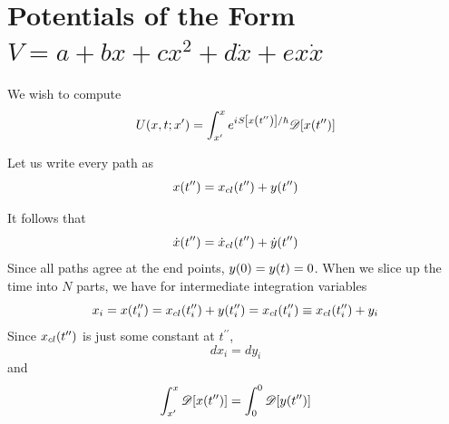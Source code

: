 	\section{Potentials of the Form \texorpdfstring{$V=a+b x+ c x^2 + d \dot{x} + e x \dot{x}$}{PDFstring}}
	We wish to compute
	\begin{equation}
		U\qty(x, t; x^\prime) = \int_{x^\prime}^{x} e^{{i\mkern1mu} S\qty[x\qty(t^{\prime\prime})] / \hbar}  \mathcal{D}\qty[x\qty(t^{\prime\prime})]
		\label{chapter12.eqn1-potential}
	\end{equation}
	
	Let us write every path as
	\begin{equation}
		x\qty(t^{\prime\prime}) =  x_{cl}\qty(t^{\prime\prime}) + y(t^{\prime\prime})
		\label{chapter12.eqn2-potential}
	\end{equation}
	
	It follows that
	\begin{equation}
		\dot{x}\qty(t^{\prime\prime}) =  \dot{x}_{cl}\qty(t^{\prime\prime}) + \dot{y}(t^{\prime\prime})
		\label{chapter12.eqn3-potential}
	\end{equation}
	Since all paths agree at the end points, $y\qty(0) = y(t) = 0$. When we slice up the time into $N$ parts, we have for intermediate integration variables
	\begin{equation}
		x_i = x\qty(t^{\prime\prime}_i) = x_{cl}\qty(t^{\prime\prime}_i) + y\qty(t^{\prime\prime}_i)  = x_{cl}\qty(t^{\prime\prime}_i) \equiv x_{cl}\qty(t^{\prime\prime}_i) + y_i
	\end{equation}
	Since $x_{cl}\qty(t^{\prime\prime})$ is just some constant at $t^{\prime\prime}$,
	\begin{equation}
		dx_i = dy_i
	\end{equation}
	and 
	\begin{equation}
		\int_{x^\prime}^{x}  \mathcal{D}\qty[x\qty(t^{\prime\prime})] = \int_{0}^{0}  \mathcal{D}\qty[y\qty(t^{\prime\prime})]
		\label{chapter12.eqn4-potential}
	\end{equation}
	
